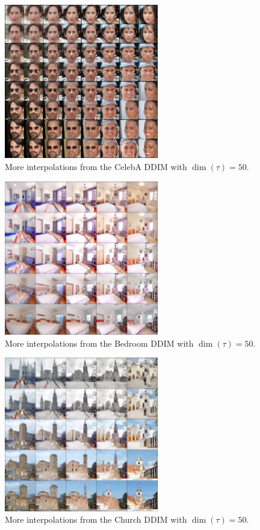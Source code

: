 \begin{figure}[htbp]
    \centering
    \includegraphics[width=0.6\textwidth]{figures/celeba-interp-grid.png}
    \caption{More interpolations from the CelebA DDIM with $\dim(\tau) = 50$.}
    \label{fig:celeba-interp-grid}
\end{figure}

\begin{figure}[htbp]
    \centering
    \includegraphics[width=0.6\textwidth]{figures/bedroom-interp-grid.png}
    \caption{More interpolations from the Bedroom DDIM with $\dim(\tau) = 50$.}
    \label{fig:bedroom-interp-grid}
\end{figure}

\begin{figure}[htbp]
    \centering
    \includegraphics[width=0.6\textwidth]{figures/church-interp-grid.png}
    \caption{More interpolations from the Church DDIM with $\dim(\tau) = 50$.}
    \label{fig:church-interp-grid}
\end{figure}